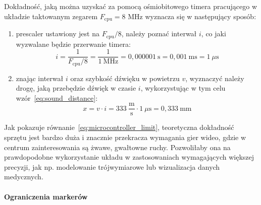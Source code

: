 Dokładność, jaką można uzyskać za pomocą ośmiobitowego timera pracującego w układzie taktowanym zegarem $F_\textrm{cpu} = 8$ MHz wyznacza się w następujący sposób:
\begin{enumerate}
 \item {}prescaler ustawiony jest na $F_\textrm{cpu}/8$, należy poznać interwał $i$, co jaki wyzwalane będzie przerwanie timera:
    \begin{equation}
      i = \frac{1}{F_\textrm{cpu}/8} = \frac{1}{1~\textrm{MHz}} = 0,000001~\textrm{s} = 0,001~\textrm{ms} = 1~\mu\textrm{s}
      \label{eq:sampling_frequency}
    \end{equation}

 \item znając interwał $i$ oraz szybkość dźwięku w powietrzu $v$, wyznaczyć należy drogę, jaką przebędzie dźwięk w czasie $i$, wykorzystując w tym celu wzór~\ref{eq:sound_distance}:
    \begin{equation}
      x = v \cdot i = 333~\frac{\textrm{m}}{\textrm{s}} \cdot 1~\mu\textrm{s} = 0,333~\textrm{mm}
      \label{eq:microcontroller_limit}
    \end{equation}
\end{enumerate}

Jak pokazuje równanie~\ref{eq:microcontroller_limit}, teoretyczna dokładność sprzętu jest bardzo duża i znacznie przekracza wymagania gier wideo, gdzie w centrum zainteresowania są żwawe, gwałtowne ruchy. Pozwoliłaby ona na prawdopodobne wykorzystanie układu w zastosowaniach wymagających większej precyzji, jak np. modelowanie trójwymiarowe lub wizualizacja danych medycznych.


\paragraph{Ograniczenia markerów}
\label{section:sound_limit}

